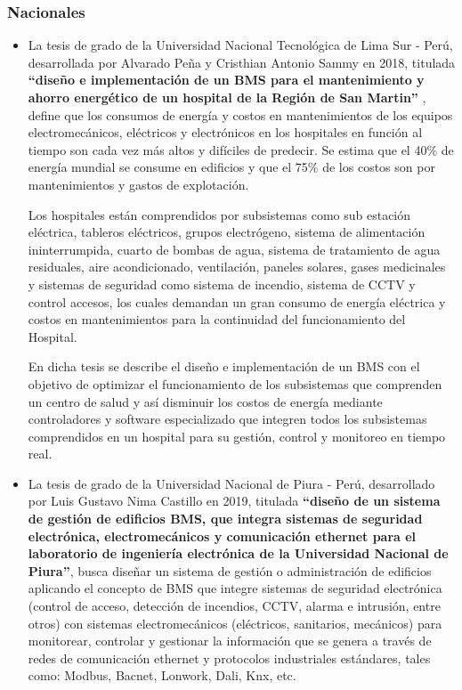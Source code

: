 \documentclass[a4paper, 12pt]{article}
\begin{document}
\subsubsection{Nacionales}
\begin{itemize}

\item La tesis de grado de la Universidad Nacional Tecnológica de Lima Sur - Perú, desarrollada por Alvarado Peña y Cristhian Antonio Sammy en 2018, titulada \textbf{“diseño e implementación de un BMS para el mantenimiento y ahorro energético de un hospital de la Región de San Martin”} \citep{TESIS01}, define que los consumos de energía y costos en mantenimientos de los equipos electromecánicos, eléctricos y electrónicos en los hospitales en función al tiempo son cada vez más altos y difíciles de predecir. Se estima que el 40\% de energía mundial se consume en edificios y que el 75\% de los costos son por mantenimientos y gastos de explotación. 

Los hospitales están comprendidos por subsistemas como sub estación eléctrica, tableros eléctricos, grupos electrógeno, sistema de alimentación ininterrumpida, cuarto de bombas de agua, sistema de tratamiento de agua residuales, aire acondicionado, ventilación, paneles solares, gases medicinales y sistemas de seguridad como sistema de incendio, sistema de CCTV y control accesos, los cuales demandan un gran consumo de energía eléctrica y costos en mantenimientos para la continuidad del funcionamiento del Hospital.


En dicha tesis se describe el diseño e implementación de un BMS con el objetivo de optimizar el funcionamiento de los subsistemas que comprenden un centro de salud y así disminuir los costos de energía mediante controladores y software especializado que integren todos los subsistemas comprendidos en un hospital para su gestión, control y monitoreo en tiempo real.


\item La tesis de grado de la Universidad Nacional de Piura - Perú, desarrollado por Luis Gustavo Nima Castillo en 2019, titulada \textbf{“diseño de un sistema de gestión de edificios BMS, que integra sistemas de seguridad electrónica, electromecánicos y comunicación ethernet para el laboratorio de ingeniería electrónica de la Universidad Nacional de Piura”}\citep{TESIS02}, busca diseñar un sistema de gestión o administración de edificios aplicando el concepto de BMS que integre sistemas de seguridad electrónica (control de acceso, detección de incendios, CCTV, alarma e intrusión, entre otros) con sistemas electromecánicos (eléctricos, sanitarios, mecánicos) para monitorear, controlar y gestionar la información que se genera a través de redes de comunicación ethernet y protocolos industriales estándares, tales como: Modbus, Bacnet, Lonwork, Dali, Knx, etc.


\end{itemize}
\end{document}
